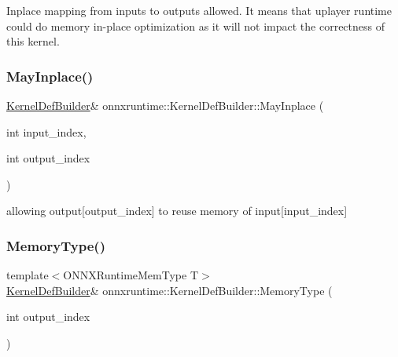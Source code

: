 Inplace mapping from inputs to outputs allowed. It means that uplayer runtime could do memory in-\/place optimization as it will not impact the correctness of this kernel. \mbox{\label{classonnxruntime_1_1KernelDefBuilder_adff085d96a9beac42baf91fc1ad23135}} 
\subsubsection{\texorpdfstring{May\+Inplace()}{MayInplace()}\hspace{0.1cm}{\footnotesize\ttfamily [2/2]}}
{\footnotesize\ttfamily \mbox{\hyperlink{classonnxruntime_1_1KernelDefBuilder}{Kernel\+Def\+Builder}}\& onnxruntime\+::\+Kernel\+Def\+Builder\+::\+May\+Inplace (\begin{DoxyParamCaption}\item[{int}]{input\+\_\+index,  }\item[{int}]{output\+\_\+index }\end{DoxyParamCaption})\hspace{0.3cm}{\ttfamily [inline]}}

allowing output\mbox{[}output\+\_\+index\mbox{]} to reuse memory of input\mbox{[}input\+\_\+index\mbox{]} \mbox{\label{classonnxruntime_1_1KernelDefBuilder_a09fef65d419d1c76521580801f8c3cb0}} 
\subsubsection{\texorpdfstring{Memory\+Type()}{MemoryType()}}
{\footnotesize\ttfamily template$<$O\+N\+N\+X\+Runtime\+Mem\+Type T$>$ \\
\mbox{\hyperlink{classonnxruntime_1_1KernelDefBuilder}{Kernel\+Def\+Builder}}\& onnxruntime\+::\+Kernel\+Def\+Builder\+::\+Memory\+Type (\begin{DoxyParamCaption}\item[{int}]{output\+\_\+index }\end{DoxyParamCaption})\hspace{0.3cm}{\ttfamily [inline]}}

